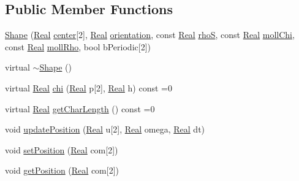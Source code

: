 \subsection*{Public Member Functions}
\begin{DoxyCompactItemize}
\item 
\hyperlink{class_shape_a5569f27971a19b8a929c98715c73e357}{Shape} (\hyperlink{_h_d_f5_dumper_8h_a445a5f0e2a34c9d97d69a3c2d1957907}{Real} \hyperlink{class_shape_a865a04fe67fc785b3cbb44806a214248}{center}\mbox{[}2\mbox{]}, \hyperlink{_h_d_f5_dumper_8h_a445a5f0e2a34c9d97d69a3c2d1957907}{Real} \hyperlink{class_shape_a1778439509ada1f3fa64472610221d19}{orientation}, const \hyperlink{_h_d_f5_dumper_8h_a445a5f0e2a34c9d97d69a3c2d1957907}{Real} \hyperlink{class_shape_a181acdc3063f20a15ba1807f7b6a5d10}{rho\+S}, const \hyperlink{_h_d_f5_dumper_8h_a445a5f0e2a34c9d97d69a3c2d1957907}{Real} \hyperlink{class_shape_ad7d270a8ffc4056d4990424dffdd0488}{moll\+Chi}, const \hyperlink{_h_d_f5_dumper_8h_a445a5f0e2a34c9d97d69a3c2d1957907}{Real} \hyperlink{class_shape_af5aa25175d49bc463fada7b11f2735e1}{moll\+Rho}, bool b\+Periodic\mbox{[}2\mbox{]})
\item 
virtual \hyperlink{class_shape_ac3b9fc48965274893f25b18aa14ba665}{$\sim$\+Shape} ()
\item 
virtual \hyperlink{_h_d_f5_dumper_8h_a445a5f0e2a34c9d97d69a3c2d1957907}{Real} \hyperlink{class_shape_aafa14cb6631bdc7a7a775e83a4bf5cdf}{chi} (\hyperlink{_h_d_f5_dumper_8h_a445a5f0e2a34c9d97d69a3c2d1957907}{Real} p\mbox{[}2\mbox{]}, \hyperlink{_h_d_f5_dumper_8h_a445a5f0e2a34c9d97d69a3c2d1957907}{Real} h) const =0
\item 
virtual \hyperlink{_h_d_f5_dumper_8h_a445a5f0e2a34c9d97d69a3c2d1957907}{Real} \hyperlink{class_shape_a702acbc7c7ac03d89a994404569f173f}{get\+Char\+Length} () const =0
\item 
void \hyperlink{class_shape_a65aa567330590a20cbda09e592e5f862}{update\+Position} (\hyperlink{_h_d_f5_dumper_8h_a445a5f0e2a34c9d97d69a3c2d1957907}{Real} u\mbox{[}2\mbox{]}, \hyperlink{_h_d_f5_dumper_8h_a445a5f0e2a34c9d97d69a3c2d1957907}{Real} omega, \hyperlink{_h_d_f5_dumper_8h_a445a5f0e2a34c9d97d69a3c2d1957907}{Real} dt)
\item 
void \hyperlink{class_shape_a6b86543faf5417011d481096603d8531}{set\+Position} (\hyperlink{_h_d_f5_dumper_8h_a445a5f0e2a34c9d97d69a3c2d1957907}{Real} com\mbox{[}2\mbox{]})
\item 
void \hyperlink{class_shape_a9bd42ded0d37d57cd2c926981fe9cec9}{get\+Position} (\hyperlink{_h_d_f5_dumper_8h_a445a5f0e2a34c9d97d69a3c2d1957907}{Real} com\mbox{[}2\mbox{]})

\end{DoxyCompactItemize}
